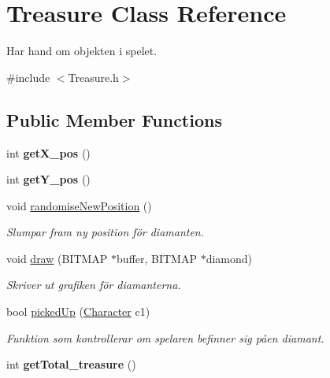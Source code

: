 \hypertarget{class_treasure}{
\section{Treasure Class Reference}
\label{class_treasure}
}


Har hand om objekten i spelet.  




{\ttfamily \#include $<$Treasure.h$>$}

\subsection*{Public Member Functions}
\begin{DoxyCompactItemize}
\item 
\hypertarget{class_treasure_a96cbdd827ac65b0cf9a960bf398afb3d}{
int {\bfseries getX\_\-pos} ()}
\label{class_treasure_a96cbdd827ac65b0cf9a960bf398afb3d}

\item 
\hypertarget{class_treasure_aa636b77baa1f792a7b73780d767f30cc}{
int {\bfseries getY\_\-pos} ()}
\label{class_treasure_aa636b77baa1f792a7b73780d767f30cc}

\item 
void \hyperlink{class_treasure_a44b7a669a64da396e70a2814ba685849}{randomiseNewPosition} ()
\begin{DoxyCompactList}\small\item\em Slumpar fram ny position f\"{o}r diamanten. \item\end{DoxyCompactList}\item 
void \hyperlink{class_treasure_a2382ccf000ba919a739087ffc67cc350}{draw} (BITMAP $\ast$buffer, BITMAP $\ast$diamond)
\begin{DoxyCompactList}\small\item\em Skriver ut grafiken f\"{o}r diamanterna. \item\end{DoxyCompactList}\item 
bool \hyperlink{class_treasure_a1b617a9a44bfab3a2a506168b328f4fb}{pickedUp} (\hyperlink{class_character}{Character} c1)
\begin{DoxyCompactList}\small\item\em Funktion som kontrollerar om spelaren befinner sig p\aa en diamant. \item\end{DoxyCompactList}\item 
\hypertarget{class_treasure_abf117fc243eb670bd24f8abd4ce027db}{
int {\bfseries getTotal\_\-treasure} ()}
\label{class_treasure_abf117fc243eb670bd24f8abd4ce027db}


\end{DoxyCompactItemize}
